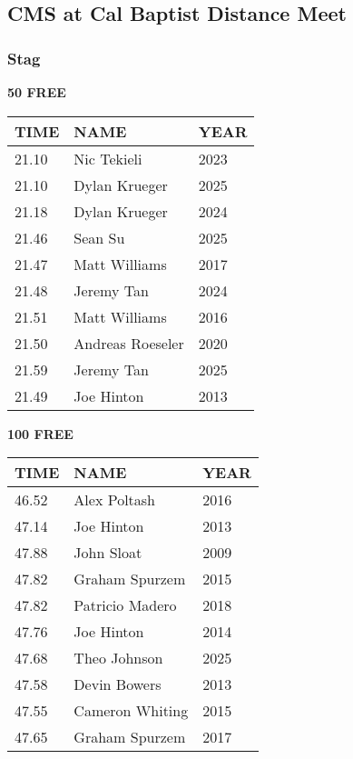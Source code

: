 \vspace{0.4cm}

\newpage

\subsection{CMS at Cal Baptist Distance Meet}
\subsubsection{Stag}

\begin{minipage}[t]{0.48\textwidth}
\centering
\textbf{50 FREE}\\[0.05cm]
\begin{tabular}{@{}p{1.8cm}p{2.8cm}p{1.2cm}@{}}
\hline
\textbf{TIME} & \textbf{NAME} & \textbf{YEAR} \\
\hline
21.10 & Nic Tekieli & 2023 \\
21.10 & Dylan Krueger & 2025 \\
21.18 & Dylan Krueger & 2024 \\
21.46 & Sean Su & 2025 \\
21.47 & Matt Williams & 2017 \\
21.48 & Jeremy Tan & 2024 \\
21.51 & Matt Williams & 2016 \\
21.50 & Andreas Roeseler & 2020 \\
21.59 & Jeremy Tan & 2025 \\
21.49 & Joe Hinton & 2013 \\
\hline
\end{tabular}
\end{minipage}\hfill
\begin{minipage}[t]{0.48\textwidth}
\centering
\textbf{100 FREE}\\[0.05cm]
\begin{tabular}{@{}p{1.8cm}p{2.8cm}p{1.2cm}@{}}
\hline
\textbf{TIME} & \textbf{NAME} & \textbf{YEAR} \\
\hline
46.52 & Alex Poltash & 2016 \\
47.14 & Joe Hinton & 2013 \\
47.88 & John Sloat & 2009 \\
47.82 & Graham Spurzem & 2015 \\
47.82 & Patricio Madero & 2018 \\
47.76 & Joe Hinton & 2014 \\
47.68 & Theo Johnson & 2025 \\
47.58 & Devin Bowers & 2013 \\
47.55 & Cameron Whiting & 2015 \\
47.65 & Graham Spurzem & 2017 \\
\hline
\end{tabular}
\end{minipage}

